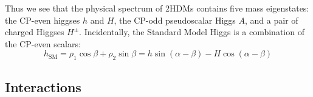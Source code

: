 Thus we see that the physical spectrum of $2$HDMs contains five mass eigenstates: the CP-even higgses $h$ and $H$, the CP-odd pseudoscalar Higgs $A$, and a pair of charged Higgses $H^\pm$. Incidentally, the Standard Model Higgs is a combination of the CP-even scalars:
\begin{equation}
h_\text{SM} = \rho_1\cos\beta + \rho_2\sin\beta = h\sin(\alpha-\beta)-H\cos(\alpha-\beta)
\label{eq:h_SM}
\end{equation}


\subsection{Interactions}

\newcommand{\sbma}{s_{\beta-\alpha}}
\newcommand{\cbma}{c_{\beta-\alpha}}
\newcommand{\casb}{c_\alpha/s_\beta}
\newcommand{\sacb}{s_\alpha/c_\beta}
\newcommand{\sasb}{s_\alpha/s_\beta}

